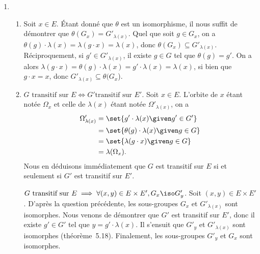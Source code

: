 
\begin{enumerate}[label=\arabic*\up{o}]
  \item %
    \begin{enumerate}
      \item %
        Soit $x\in E$.
        Étant donné que $\theta$ est un isomorphisme, il nous suffit de démontrer que $\theta(G_x) = G'_{\lambda(x)}$.
        Quel que soit $g\in G_x$, on a $\theta(g)\cdot\lambda(x) = \lambda(g\cdot x) = \lambda(x)$, donc $\theta(G_x)\subseteq G'_{\lambda(x)}$.
        Réciproquement, si $g'\in G'_{\lambda(x)}$, il existe $g\in G$ tel que $\theta(g) = g'$.
        On a alors $\lambda(g\cdot x) = \theta(g)\cdot\lambda(x) = g'\cdot\lambda(x) = \lambda(x)$, si bien que $g\cdot x = x$, donc $G'_{\lambda(x)} \subseteq \theta(G_x$).

      \item %
        \emph{$G \text{ transitif sur } E \iff G' \text{transitif sur } E'$.}
        Soit $x\in E$.
        L'orbite de $x$ étant notée $\Omega_x$ et celle de $\lambda(x)$ étant notée $\Omega'_{\lambda(x)}$, on a
        \begin{align*}
          \Omega'_{\lambda(x)}
            &= \set{g'\cdot\lambda(x)\given g'\in G'} \\
            &= \set{\theta(g)\cdot\lambda(x)\given g\in G} \\
            &= \set{\lambda(g\cdot x)\given g\in G} \\
            &= \lambda(\Omega_x).
        \end{align*}
        Nous en déduisons immédiatement que $G$ est transitif sur $E$ si et seulement si $G'$ est transitif sur $E'$.

        \emph{$G \text{ transitif sur } E \implies \forall (x, y)\in E\times E', G_x\iso G'_y$.}
        Soit $(x, y)\in E\times E'$.
        D'après la question précédente, les sous-groupes $G_x$ et $G'_{\lambda(x)}$ sont isomorphes.
        Nous venons de démontrer que $G'$ est transitif sur $E'$, donc il existe $g'\in G'$ tel que $y = g'\cdot\lambda(x)$.
        Il s'ensuit que $G'_y$ et $G'_{\lambda(x)}$ sont isomorphes (théorème~5.18).
        Finalement, les sous-groupes $G'_y$ et $G_x$ sont isomorphes.


\end{enumerate}
\end{enumerate}
